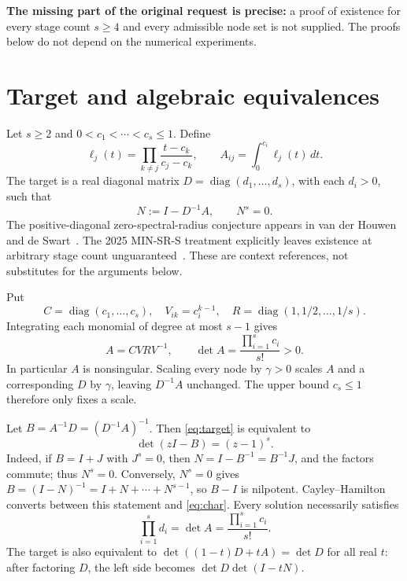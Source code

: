 \documentclass[11pt]{article}
\theoremstyle{remark}
\DeclareMathOperator{\diag}{diag}
\begin{document}
\textbf{The missing part of the original request is precise:} a proof of existence
for every stage count $s\geq4$ and every admissible node set is not supplied.
The proofs below do not depend on the numerical experiments.

\newpage
\tableofcontents
\medskip

\section{Target and algebraic equivalences}
Let $s\geq2$ and $0<c_1<\cdots<c_s\leq1$. Define
\begin{equation}\label{eq:problem}
 \ell_j(t)=\prod_{k\ne j}\frac{t-c_k}{c_j-c_k},\qquad
 A_{ij}=\int_0^{c_i}\ell_j(t)\,dt.
\end{equation}
The target is a real diagonal matrix $D=\diag(d_1,\ldots,d_s)$, with each $d_i>0$,
such that
\begin{equation}\label{eq:target}
 N:=I-D^{-1}A,\qquad N^s=0.
\end{equation}
The positive-diagonal zero-spectral-radius conjecture appears in van der Houwen
and de Swart~\cite[\S3.2.1, p.~46]{houwen}. The 2025 MIN-SR-S treatment explicitly
leaves existence at arbitrary stage count unguaranteed~\cite[\S2.2.3, p.~A439]{sdc}.
These are context references, not substitutes for the arguments below.

Put
\[
 C=\diag(c_1,\ldots,c_s),\quad V_{ik}=c_i^{k-1},\quad
 R=\diag(1,1/2,\ldots,1/s).
\]
Integrating each monomial of degree at most $s-1$ gives
\begin{equation}\label{eq:vandermonde}
 A=CVRV^{-1},\qquad \det A=\frac{\prod_{i=1}^s c_i}{s!}>0.
\end{equation}
In particular $A$ is nonsingular. Scaling every node by $\gamma>0$ scales $A$
and a corresponding $D$ by $\gamma$, leaving $D^{-1}A$ unchanged. The upper
bound $c_s\leq1$ therefore only fixes a scale.

Let $B=A^{-1}D=(D^{-1}A)^{-1}$. Then \eqref{eq:target} is equivalent to
\begin{equation}\label{eq:char}
 \det(zI-B)=(z-1)^s.
\end{equation}
Indeed, if $B=I+J$ with $J^s=0$, then
$N=I-B^{-1}=B^{-1}J$, and the factors commute; thus $N^s=0$.
Conversely, $N^s=0$ gives
$B=(I-N)^{-1}=I+N+\cdots+N^{s-1}$, so $B-I$ is nilpotent.
Cayley--Hamilton converts between this statement and \eqref{eq:char}.
Every solution necessarily satisfies
\begin{equation}\label{eq:prod}
 \prod_{i=1}^s d_i=\det A=\frac{\prod_{i=1}^s c_i}{s!}.
\end{equation}
The target is also equivalent to $\det((1-t)D+tA)=\det D$ for all real $t$: after factoring
$D$, the left side becomes $\det D\det(I-tN)$.
\end{document}
